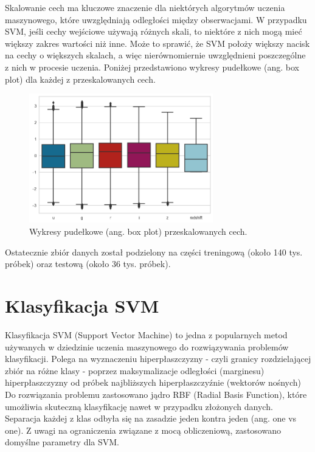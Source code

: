 \documentclass[conference]{IEEEtran}
\begin{document}
Skalowanie cech ma kluczowe znaczenie dla niektórych algorytmów uczenia maszynowego, które uwzględniają odległości między obserwacjami. W przypadku SVM, jeśli cechy wejściowe używają różnych skali, to niektóre z nich mogą mieć większy zakres wartości niż inne. Może to sprawić, że SVM położy większy nacisk na cechy o większych skalach, a więc nierównomiernie uwzględnieni poszczególne z nich w procesie uczenia.
Poniżej przedstawiono wykresy pudełkowe (ang. box plot) dla każdej z przeskalowanych cech.
\begin{figure}[ht]
        \centering
        \includegraphics[width = 8cm]{figures/scaled_data.png}
        \caption{Wykresy pudełkowe (ang. box plot) przeskalowanych cech.}
\end{figure} 

Ostatecznie zbiór danych został podzielony na części treningową (około 140 tys. próbek) oraz testową (około 36 tys. próbek).
\section{Klasyfikacja SVM}
Klasyfikacja SVM (Support Vector Machine) to jedna z popularnych metod używanych w dziedzinie uczenia maszynowego do rozwiązywania problemów klasyfikacji. Polega na wyznaczeniu hiperpłaszczyzny - czyli granicy rozdzielającej zbiór na różne klasy - poprzez maksymalizacje odległości (marginesu) hiperpłaszczyzny od próbek najbliższych hiperpłaszczyźnie (wektorów nośnych)
Do rozwiązania problemu zastosowano jądro RBF (Radial Basis Function), które umożliwia skuteczną klasyfikację nawet w przypadku złożonych danych. Separacja każdej z klas odbyła się na zasadzie jeden kontra jeden (ang. one vs one). Z uwagi na ograniczenia związane z mocą obliczeniową, zastosowano domyślne parametry dla SVM.
\end{document}
